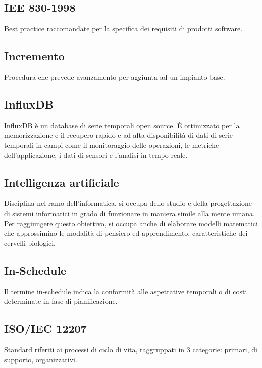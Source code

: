 	\newpage


	\subsection{IEE 830-1998}
	\label{sec:iee830}
	Best practice raccomandate per la specifica dei \underline{\hyperref[sec:requisito]{requisiti}} di \underline{\hyperref[sec:prodottosoftware]{prodotti software}}.


	\subsection{Incremento}
	\label{sec:incremento}
	Procedura che prevede avanzamento per aggiunta ad un impianto base.


	\subsection{InfluxDB}
	\label{sec:influxdb}
	InfluxDB è un database di serie temporali open source. È ottimizzato per la memorizzazione e il recupero rapido e ad alta disponibilità di dati di serie temporali in campi come il monitoraggio delle operazioni, le metriche dell'applicazione, i dati di sensori e l'analisi in tempo reale.


	\subsection{Intelligenza artificiale}
	\label{sec:ia}
	Disciplina nel ramo dell'informatica, si occupa dello studio e della progettazione di sistemi informatici in grado di funzionare in maniera simile alla mente umana. Per raggiungere questo obiettivo, si occupa anche di elaborare modelli matematici che approssimino le modalità di pensiero ed apprendimento, caratteristiche dei cervelli biologici.


	\subsection{In-Schedule}
	\label{sec:inschedule}
	Il termine in-schedule indica la conformità alle aspettative temporali o di costi determinate in fase di pianificazione.


	\subsection{ISO/IEC 12207}
	\label{sec:iso12207}
	Standard riferiti ai processi di \underline{\hyperref[sec:ciclodivita]{ciclo di vita}}, raggruppati in 3 categorie: primari, di supporto, organizzativi.


